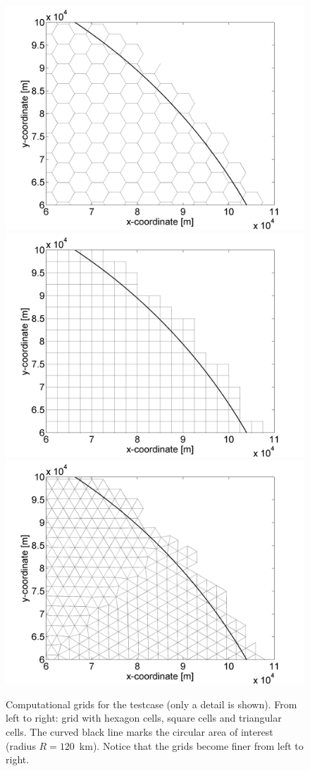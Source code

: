 \begin{figure}[h!]
\begin{center}
\includegraphics[width=0.32\columnwidth]{../../c043_thacker2d_hexagons/doc/figures/thacker2dgridhexagons.png}
\includegraphics[width=0.32\columnwidth]{../../c044_thacker2d_squares/doc/figures/thacker2dgridsquares.png}
\includegraphics[width=0.32\columnwidth]{../../c045_thacker2d_triangles/doc/figures/thacker2dgridtriangles.png}
\end{center}\caption{Computational grids for the testcase (only a detail is shown). From left to right: grid with hexagon cells, square cells and triangular cells. The curved black line marks the circular area of interest (radius $R = 120$~km). Notice that the grids become finer from left to right. \label{fig:thacker2dgrids}}
\end{figure}


